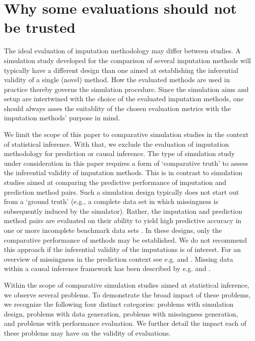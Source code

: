 \documentclass[bimj,fleqn]{w-art}
\begin{document}

\section{Why some evaluations should not be trusted}

The ideal evaluation of imputation methodology may differ between studies. A simulation study developed for the comparison of several imputation methods will typically have a different design than one aimed at establishing the inferential validity of a single (novel) method. How the evaluated methods are used in practice thereby governs the simulation procedure. Since the simulation aims and setup are intertwined with the choice of the evaluated imputation methods, one should always asses the suitablity of the chosen evaluation metrics with the imputation methods' purpose in mind. 

We limit the scope of this paper to comparative simulation studies in the context of statistical inference. With that, we exclude the evaluation of imputation methodology for prediction or causal inference. The type of simulation study under consideration in this paper requires a form of `comparative truth' to assess the inferential validity of imputation methods. This is in contrast to simulation studies aimed at comparing the predictive performance of imputation and prediction method pairs. Such a simulation design typically does not start out from a `ground truth' (e.g., a complete data set in which missingness is subsequently induced by the simulator). Rather, the imputation and prediction method pairs are evaluated on their ability to yield high predictive accuracy in one or more incomplete benchmark data sets \citep{liu21}. In these designs, only the comparative performance of methods may be established. We do not recommend this approach if the inferential validity of the imputations is of interest. For an overview of missingness in the prediction context see e.g. \citet{wood15} and \citet{sper20}. Missing data within a causal inference framework has been described by e.g. \cite{more18} and \cite{moha21}.

Within the scope of comparative simulation studies aimed at statistical inference, we observe several problems. To demonstrate the broad impact of these problems, we recognize the following four distinct categories: problems with simulation design, problems with data generation, problems with missingness generation, and problems with performance evaluation. We further detail the impact each of these problems may have on the validity of evaluations. 
\end{document}
